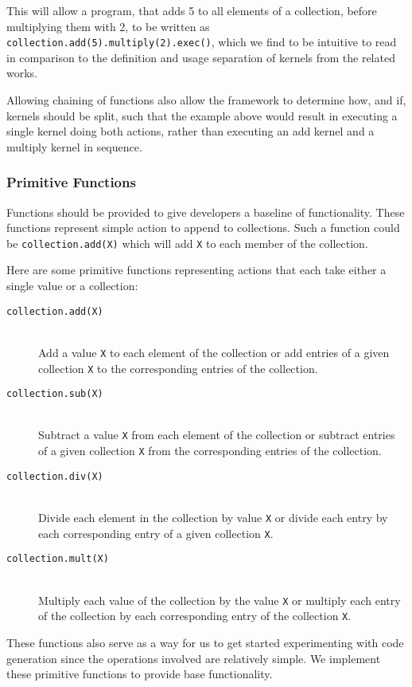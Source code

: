 This will allow a program, that adds 5 to all elements of a collection, before multiplying them with 2, to be written as \texttt{collection.add(5).multiply(2).exec()}, which we find to be intuitive to read in comparison to the definition and usage separation of kernels from the related works.

Allowing chaining of functions also allow the framework to determine how, and if, kernels should be split, such that the example above would result in executing a single kernel doing both actions, rather than executing an add kernel and a multiply kernel in sequence.

\subsubsection{Primitive Functions}
Functions should be provided to give developers a baseline of functionality. These functions represent simple action to append to collections. Such a function could be \texttt{collection.add(X)} which will add \texttt{X} to each member of the collection. 

Here are some primitive functions representing actions that each take either a single value or a collection: 
\begin{description}
\item[\texttt{collection.add(X)}]\hfill\\
Add a value \texttt{X} to each element of the collection or add entries of a given collection \texttt{X} to the corresponding entries of the collection.
\item[\texttt{collection.sub(X)}]\hfill\\
Subtract a value \texttt{X} from each element of the collection or subtract entries of a given collection \texttt{X} from the corresponding entries of the collection.
\item[\texttt{collection.div(X)}]\hfill\\
Divide each element in the collection by value \texttt{X} or divide each entry by each corresponding entry of a given collection \texttt{X}.
\item[\texttt{collection.mult(X)}]\hfill\\
Multiply each value of the collection by the value \texttt{X} or multiply each entry of the collection by each corresponding entry of the collection \texttt{X}.
\end{description}

These functions also serve as a way for us to get started experimenting with code generation since the operations involved are relatively simple. We implement these primitive functions to provide base functionality.

